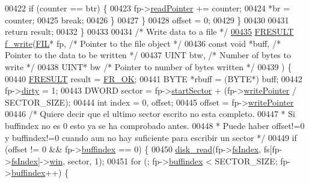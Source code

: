 \begin{DoxyCode}
00422       \textcolor{keywordflow}{if} (counter == btr) \{
00423         fp->\hyperlink{structFIL_ad0d1f48655e0e06936cb7883993afb1f}{readPointer} += counter;
00424         *br = counter;
00425         \textcolor{keywordflow}{break};
00426       \}
00427     \}
00428     offset = 0;
00429   \}
00430 
00431   \textcolor{keywordflow}{return} result;
00432 \}
00433 
00434 \textcolor{comment}{/* Write data to a file */}
\hypertarget{fileSystem_8c_source_l00435}{}\hyperlink{fileSystem_8h_ae6a4dfae8a9e308bdb2283a37ef680f2}{00435} \hyperlink{fileSystem_8h_a49d0171ecbd362cda5680a0d360db44c}{FRESULT} \hyperlink{fileSystem_8c_ae6a4dfae8a9e308bdb2283a37ef680f2}{f\_write}(\hyperlink{structFIL}{FIL}* fp, \textcolor{comment}{/* Pointer to the file object */}
00436 \textcolor{keyword}{const} \textcolor{keywordtype}{void} *buff, \textcolor{comment}{/* Pointer to the data to be written */}
00437 UINT btw, \textcolor{comment}{/* Number of bytes to write */}
00438 UINT* bw \textcolor{comment}{/* Pointer to number of bytes written */}
00439 ) \{
00440   \hyperlink{fileSystem_8h_a49d0171ecbd362cda5680a0d360db44c}{FRESULT} result = \hyperlink{fileSystem_8h_a49d0171ecbd362cda5680a0d360db44ca62fce5cd9df008f8fc85f99706bda5f1}{FR\_OK};
00441   BYTE *rbuff = (BYTE*) buff;
00442   fp->\hyperlink{structFIL_a32847fe875861954ec3dc750d332a194}{dirty} = 1;
00443   DWORD sector = fp->\hyperlink{structFIL_a684d4d555f293b08b8396c35e20706d3}{startSector} + (fp->\hyperlink{structFIL_a89e92b4845c72b4f9f119b38d1142a41}{writePointer} / SECTOR\_SIZE);
00444   \textcolor{keywordtype}{int} index = 0, offset;
00445   offset = fp->\hyperlink{structFIL_a89e92b4845c72b4f9f119b38d1142a41}{writePointer} %
00446   \textcolor{comment}{/* Quiere decir que el ultimo sector escrito no esta completo.}
00447 \textcolor{comment}{   * Si buffindex no es 0 esto ya se ha comprobado antes.}
00448 \textcolor{comment}{   * Puede haber offset!=0 y buffindex!=0 cuando aun no hay suficiente para escribir un sector */}
00449   \textcolor{keywordflow}{if} (offset != 0 && fp->\hyperlink{structFIL_a5fb6271e3cc261b9f811bb8860cb6110}{buffindex} == 0) \{
00450     \hyperlink{diskio_8c_a9c6f716a2119a650cf3c61bee540be85}{disk\_read}(fp->\hyperlink{structFIL_ab32bf8d0b478b2cef4942b2128f4f5f5}{fsIndex}, fs[fp->\hyperlink{structFIL_ab32bf8d0b478b2cef4942b2128f4f5f5}{fsIndex}]->\hyperlink{structFS_a23d4e26f31e8932d8b216955e6af2130}{win}, sector, 1);
00451     \textcolor{keywordflow}{for} (; fp->\hyperlink{structFIL_a5fb6271e3cc261b9f811bb8860cb6110}{buffindex} < SECTOR\_SIZE; fp->\hyperlink{structFIL_a5fb6271e3cc261b9f811bb8860cb6110}{buffindex}++) \{

\end{DoxyCode}
